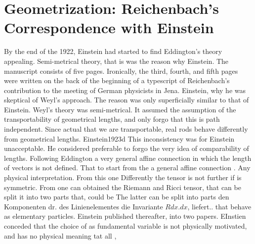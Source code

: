 \documentclass[draft]{article}
\begin{document}
\section{Geometrization: Reichenbach's Correspondence with Einstein}
\label{geometrization}
By the end of the 1922, Einstein had started to find Eddington's theory appealing. Semi-metrical theory, that is was the reason why Einstein. The manuscript consists of five pages. Ironically, the third, fourth, and fifth pages were written on the back of the beginning of a typescript of Reichenbach’s contribution to the meeting of German physicists in Jena. Einstein, why he was skeptical of Weyl's approach. The reason was only superficially similar to that of Einstein. Weyl's theory was semi-metrical. It assumed the assumption of the transportability of geometrical lengths, and only forgo that this is path independent. Since actual \rac that we are transportable, real rods behave differently from geometrical lengths. Einstein1923d This inconsistency was for Einstein unacceptable. He considered preferable to forgo the very idea of comparability of lengths. Following Eddington a very general affine connection in which the length of vectors is not defined. That to start from the a general affine connection \Gtmn. Any physical interpretation. From this one Differently the tensor is not further if is symmetric. From one can obtained the Riemann and Ricci tensor, that can be split it into two parts that, could be  The latter can be split into parts den Komponenten dr. des Linienelementes die Invariante $R dx.dx$, liefert.. that behave as elementary particles. Einstein published thereafter, into two papers. EInstien conceded that the choice of \Gtmn as fundamental variable is not physically motivated, and \Gtmn has no physical meaning tat all ,

\end{document}
